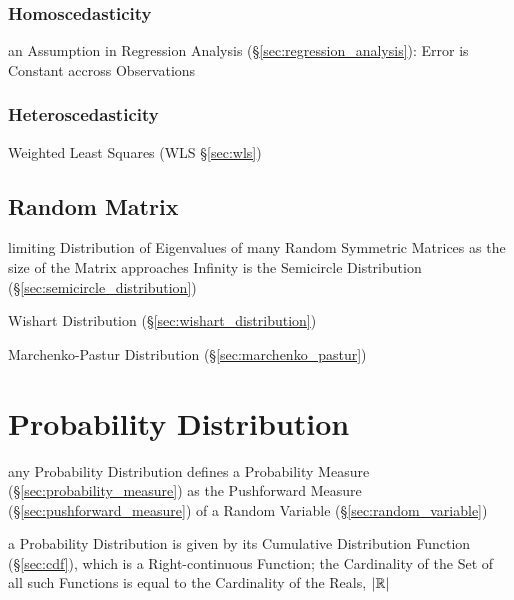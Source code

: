 \subsubsection{Homoscedasticity}\label{sec:homoscedasticity}

an Assumption in Regression Analysis (\S\ref{sec:regression_analysis}): Error is
Constant accross Observations



\subsubsection{Heteroscedasticity}\label{sec:heteroscedasticity}

Weighted Least Squares (WLS \S\ref{sec:wls})



\subsection{Random Matrix}\label{sec:random_matrix}

limiting Distribution of Eigenvalues of many Random Symmetric Matrices
as the size of the Matrix approaches Infinity is the Semicircle Distribution
(\S\ref{sec:semicircle_distribution})

Wishart Distribution (\S\ref{sec:wishart_distribution})

Marchenko-Pastur Distribution (\S\ref{sec:marchenko_pastur})



\section{Probability Distribution}\label{sec:probability_distribution}

any Probability Distribution defines a Probability Measure
(\S\ref{sec:probability_measure}) as the Pushforward Measure
(\S\ref{sec:pushforward_measure}) of a Random Variable
(\S\ref{sec:random_variable})

a Probability Distribution is given by its Cumulative Distribution Function
(\S\ref{sec:cdf}), which is a Right-continuous Function; the Cardinality of the
Set of all such Functions is equal to the Cardinality of the Reals, $|\mathbb{R}|$

